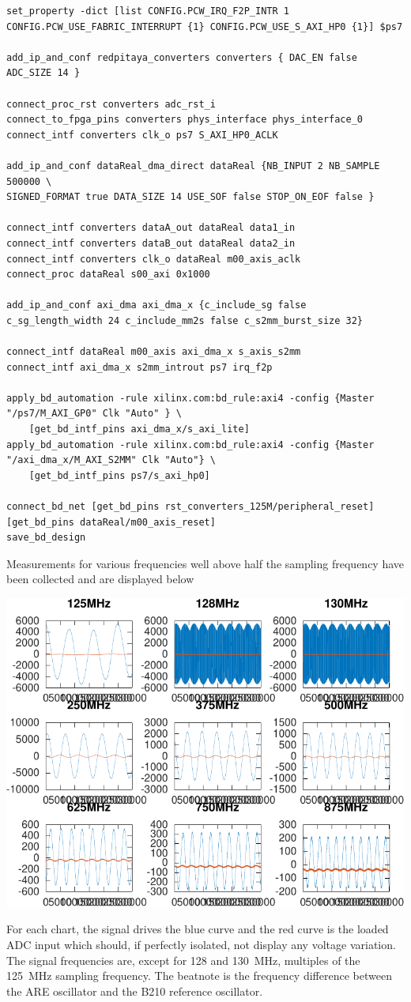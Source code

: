 \documentclass[4paper]{article}
\begin{document}
{\footnotesize
\begin{verbatim}
set_property -dict [list CONFIG.PCW_IRQ_F2P_INTR 1 CONFIG.PCW_USE_FABRIC_INTERRUPT {1} CONFIG.PCW_USE_S_AXI_HP0 {1}] $ps7

add_ip_and_conf redpitaya_converters converters { DAC_EN false ADC_SIZE 14 }

connect_proc_rst converters adc_rst_i
connect_to_fpga_pins converters phys_interface phys_interface_0
connect_intf converters clk_o ps7 S_AXI_HP0_ACLK

add_ip_and_conf dataReal_dma_direct dataReal {NB_INPUT 2 NB_SAMPLE 500000 \
SIGNED_FORMAT true DATA_SIZE 14 USE_SOF false STOP_ON_EOF false }

connect_intf converters dataA_out dataReal data1_in
connect_intf converters dataB_out dataReal data2_in
connect_intf converters clk_o dataReal m00_axis_aclk
connect_proc dataReal s00_axi 0x1000

add_ip_and_conf axi_dma axi_dma_x {c_include_sg false c_sg_length_width 24 c_include_mm2s false c_s2mm_burst_size 32}

connect_intf dataReal m00_axis axi_dma_x s_axis_s2mm
connect_intf axi_dma_x s2mm_introut ps7 irq_f2p

apply_bd_automation -rule xilinx.com:bd_rule:axi4 -config {Master "/ps7/M_AXI_GP0" Clk "Auto" } \
    [get_bd_intf_pins axi_dma_x/s_axi_lite]
apply_bd_automation -rule xilinx.com:bd_rule:axi4 -config {Master "/axi_dma_x/M_AXI_S2MM" Clk "Auto"} \
    [get_bd_intf_pins ps7/s_axi_hp0]

connect_bd_net [get_bd_pins rst_converters_125M/peripheral_reset] [get_bd_pins dataReal/m00_axis_reset]
save_bd_design
\end{verbatim}
}

Measurements for various frequencies well above half the sampling frequency have been collected
and are displayed below

\vspace{-0.3cm}
\begin{center}
\includegraphics[width=.8\linewidth]{all}
\end{center}

For each chart, the signal drives the blue curve and the red curve is the loaded ADC input which 
should, if perfectly isolated, not display any voltage variation. The signal frequencies are, except
for 128 and 130~MHz, multiples of the 125~MHz sampling frequency. The beatnote is the frequency
difference between the ARE oscillator and the B210 reference oscillator.
\end{document}
